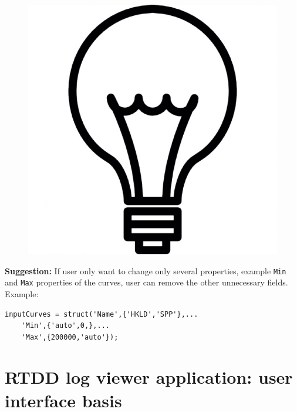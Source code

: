 \documentclass[12pt,a4paper,oneside]{report}
\begin{document}
\pagebreak
\begin{figure}
\includegraphics[scale=0.03]{fig/light_bulb.jpg}
\end{figure}
\noindent\textbf{Suggestion:} If user only want to change only several properties, example \texttt{Min} and \texttt{Max} properties of the curves, user can remove the other unnecessary fields. Example:
\begin{lstlisting}[style=Matlab-editor]
inputCurves = struct('Name',{'HKLD','SPP'},...
    'Min',{'auto',0,},...
    'Max',{200000,'auto'});
\end{lstlisting}

\chapter{RTDD log viewer application: user interface basis}
\end{document}
